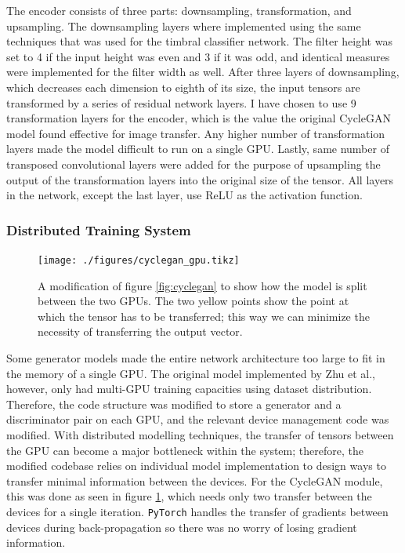 \documentclass[12pt,a4paper,]{report}
\begin{document}
The encoder consists of three parts: downsampling, transformation, and
upsampling. The downsampling layers where implemented using the same
techniques that was used for the timbral classifier network. The filter
height was set to 4 if the input height was even and 3 if it was odd,
and identical measures were implemented for the filter width as well.
After three layers of downsampling, which decreases each dimension to
eighth of its size, the input tensors are transformed by a series of
residual network layers. I have chosen to use 9 transformation layers
for the encoder, which is the value the original CycleGAN model found
effective for image transfer. Any higher number of transformation layers
made the model difficult to run on a single GPU. Lastly, same number of
transposed convolutional layers were added for the purpose of upsampling
the output of the transformation layers into the original size of the
tensor. All layers in the network, except the last layer, use ReLU as
the activation function.

\hypertarget{distributed-training-system}{%
\subsubsection{Distributed Training
System}\label{distributed-training-system}}

\begin{figure}[h]
    \texttt{[image: ./figures/cyclegan\_gpu.tikz]}
    \centering
    \caption[Distributed CycleGAN Diagram]{A modification of figure \ref{fig:cyclegan} to show how the model is split between the two GPUs. The two yellow points show the point at which the tensor has to be transferred; this way we can minimize the necessity of transferring the output vector.} \label{fig:cyclegan_gpu}
\end{figure}

Some generator models made the entire network architecture too large to
fit in the memory of a single GPU. The original model implemented by Zhu
et al., however, only had multi-GPU training capacities using dataset
distribution. Therefore, the code structure was modified to store a
generator and a discriminator pair on each GPU, and the relevant device
management code was modified. With distributed modelling techniques, the
transfer of tensors between the GPU can become a major bottleneck within
the system; therefore, the modified codebase relies on individual model
implementation to design ways to transfer minimal information between
the devices. For the CycleGAN module, this was done as seen in figure
\ref{fig:cyclegan_gpu}, which needs only two transfer between the
devices for a single iteration. \texttt{PyTorch} handles the transfer of
gradients between devices during back-propagation so there was no worry
of losing gradient information.
\end{document}
